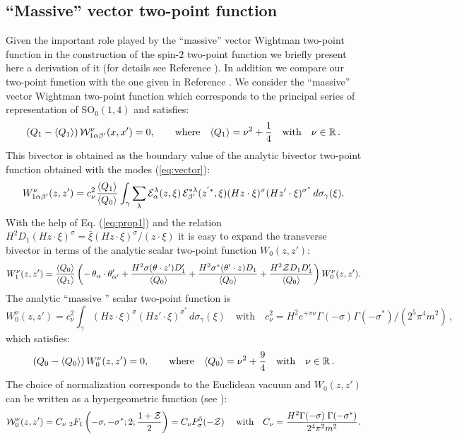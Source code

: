 \documentclass[a4paper,11pt,showpacs,preprintnumbers]{revtex4}
\def\setR{\mathbb{R}}
\def\z {{\cal Z}}
\begin{document}
\begin{appendix}
\section{``Massive'' vector two-point function}
Given the important role played by the ``massive'' vector Wightman
two-point function in the construction of the spin-$2$ two-point
function we briefly present  here a derivation of it (for details
see Reference \cite{gata}). In addition we compare our two-point
function with the one given in Reference \cite{allen}. We consider
the ``massive'' vector Wightman two-point function which
corresponds to the principal series of representation of
SO$_{0}(1,4)$ and satisfies:
$$\left(Q_{1} -\langle Q_{1} \rangle\right){\cal
W}^{\nu}_{1\alpha\beta'}(x,x')=0,\qquad \mbox{where}\quad\langle
Q_{1} \rangle=\nu^2+{{1}\over{4}}\quad
\mbox{with}\quad\nu\in\setR\,.$$ This bivector is obtained as the
boundary value of the analytic bivector  two-point function
obtained with the modes (\ref{eq:vector}):
\begin{equation*}
W^\nu _{1\alpha \beta'}(z,z')= c_\nu^{2}\frac{\langle Q_{1}
\rangle}{\langle Q_{0} \rangle}\int_\gamma \sum_{\lambda}{\cal
E}^{\lambda}_{\alpha }(z,\xi) \,{\cal
E}^{*\lambda}_{\beta'}(z^{'*},\xi) (Hz\cdot\xi)^{\sigma}(H z'\cdot
\xi)^{\sigma^{*}}\,d\sigma_\gamma(\xi).
\end{equation*}
With the  help of Eq. (\ref{eq:prop1}) and the relation
$H^{2}D_{1}\left( Hz\cdot \xi\right)^{\sigma}=\bar\xi\left(
Hz\cdot \xi\right)^{\sigma}/\left( z\cdot \xi\right)$ it is easy
to expand the transverse bivector  in terms of the analytic scalar
two-point function $W_{0}(z,z')$:
\begin{equation}
W^{\nu}_{1}(z,z') =\frac{\langle Q_{0}\rangle }{\langle
Q_{1}\rangle}\left(-\,\theta_{\alpha}\cdot\theta'_{\alpha'}+
\frac{H^{2}\sigma(\theta\cdot z' )D'_{1}}{\langle Q_{0}\rangle }+
\frac{H^{2}\sigma^{*}(\theta'\cdot z) D_{1}}{\langle Q_{0}\rangle
}+ \frac{ H^2\z D_{1}D'_{1}}{\langle Q_{0}\rangle}\right)
W^{\nu}_{0}(z,z').\label{eq:vec}
\end{equation}
The analytic ``massive '' scalar two-point function is
\begin{equation*}
 W^\nu_{0}(z,z')= c_\nu^{2}\int_\gamma
(Hz\cdot\xi)^{\sigma}(H z'\cdot \xi
)^{\sigma^{*}}\,d\sigma_\gamma(\xi)\quad\mbox{with}\quad
c_{\nu}^{2}=H^2e^{+\pi\nu}\Gamma(-\sigma) \Gamma (-\sigma^*)/(2^5
\pi^4m^2)\,,
\end{equation*}
which satisfies:
$$\left(Q_{0} -\langle Q_{0} \rangle\right)W^{\nu}_{0}(z,z')=0,\qquad \mbox{where}\quad\langle Q_{0}
\rangle=\nu^2+{{9}\over{4}}\quad \mbox{with}\quad\nu\in\setR\,. $$
The choice of normalization corresponds to the Euclidean vacuum
and $W_0(z,z')$ can be written as a  hypergeometric function (see
\cite{brmo}):
$$ {\cal W}^\nu_{0}(z,z')= C_{\nu}\;
_{2}F_{1}\left(-\sigma,-\sigma^*;2;\frac{1+\z}{2}\right)= C_{\nu}
P_{\sigma}^{5}(-\z) \;\quad\mbox{with}\quad C_{\nu}=\frac{
H^2\Gamma(-\sigma)\; \Gamma (-\sigma^*)}{2^4 \pi^2m^2}.$$


\end{appendix}
\end{document}

